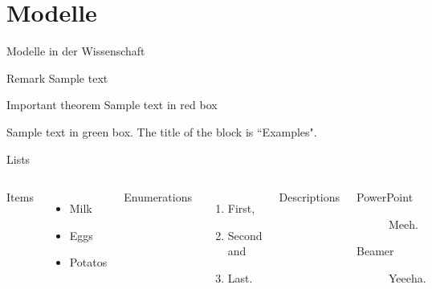 \section{Modelle}

\begin{frame}{Modelle in der Wissenschaft}
\begin{block}{Remark}
Sample text
\end{block}

\begin{alertblock}{Important theorem}
Sample text in red box
\end{alertblock}

\begin{examples}
Sample text in green box. The title of the block is ``Examples".
\end{examples}
    
\end{frame}


\begin{frame}{Lists}
  \begin{columns}[T,onlytextwidth]
      Items
      \begin{itemize}
        \item Milk \item Eggs \item Potatos
      \end{itemize}

      Enumerations
      \begin{enumerate}
        \item First, \item Second and \item Last.
      \end{enumerate}

      Descriptions
      \begin{description}
        \item[PowerPoint] Meeh. \item[Beamer] Yeeeha.
      \end{description}
  \end{columns}
\end{frame}

